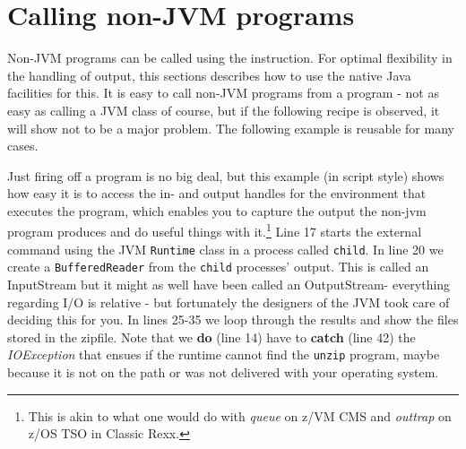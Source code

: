 {%








\chapter{Calling non-JVM programs}
Non-JVM programs can be called using the  instruction.
For optimal flexibility in the handling of output, this sections
describes how to use the native Java facilities for this.
It is easy to call non-JVM programs
from a \nr{} program - not as easy as calling a JVM class of course, but if
the following recipe is observed, it will show not to be a major
problem. The following example is reusable for many cases.
 
Just firing off a program is no big deal, but this example (in script
style) shows how easy it is to access the in- and output handles for
the environment that executes the program, which enables you to
capture the output the non-jvm program produces and do useful things
with it.\footnote{This is akin to what one would do with \emph{queue}
  on z/VM CMS and \emph{outtrap} on z/OS TSO in Classic Rexx.}
Line 17 starts the external command using the JVM \texttt{Runtime}
class in a process called \texttt{child}. In line 20 we create a
\texttt{BufferedReader} from the \texttt{child} processes'
output. This is called an InputStream but it might as well have been
called an OutputStream- everything regarding I/O is relative - but
fortunately the designers of the JVM took care of deciding this for you.
In lines 25-35 we loop through the results and show the files stored
in the zipfile. Note that we \textbf{do} (line 14) have to \textbf{catch} (line
42) the \emph{IOException} that ensues if the runtime cannot find the
\texttt{unzip} program, maybe because it is not on the path or was not
delivered with your operating system. 


}

